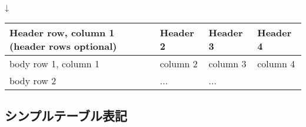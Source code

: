 \documentclass[letterpaper,10pt,dvipdfmx,openany,oneside]{sphinxmanual}
\begin{document}
\begin{sphinxVerbatim}[commandchars=\\\{\}]
                                          
\end{sphinxVerbatim}

↓


\begin{savenotes}\sphinxattablestart
\centering
\begin{tabulary}{\linewidth}[t]{|T|T|T|T|}
\hline
\sphinxstyletheadfamily 
Header row, column 1
(header rows optional)
&\sphinxstyletheadfamily 
Header 2
&\sphinxstyletheadfamily 
Header 3
&\sphinxstyletheadfamily 
Header 4
\\
\hline
body row 1, column 1
&
column 2
&
column 3
&
column 4
\\
\hline
body row 2
&
...
&
...
&\\
\hline
\end{tabulary}
\par
\sphinxattableend\end{savenotes}


\subsection{シンプルテーブル表記}
\label{\detokenize{1.chapter/basic_syntax:id2}}
\begin{sphinxVerbatim}[commandchars=\\\{\}]
    
              
    
    
     
     
      
    
\end{sphinxVerbatim}
\end{document}
